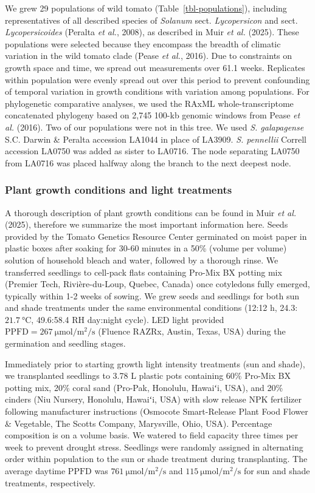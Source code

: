 \documentclass[
  letterpaper,
  DIV=11,
  numbers=noendperiod]{scrartcl}
\newcommand{\ppfd}{$\mathrm{PPFD}$}
\newcommand{\ppfdqty}[1]{$\SI{#1}{\micro\mole\per\meter\squared\per\second}$}
\begin{document}
We grew 29 populations of wild tomato (Table~\ref{tbl-populations}),
including representatives of all described species of \emph{Solanum}
sect. \emph{Lycopersicon} and sect. \emph{Lycopersicoides} (Peralta
\emph{et al.}, 2008), as described in Muir \emph{et al.} (2025). These
populations were selected because they encompass the breadth of climatic
variation in the wild tomato clade (Pease \emph{et al.}, 2016). Due to
constraints on growth space and time, we spread out measurements over
61.1 weeks. Replicates within population were evenly spread out over
this period to prevent confounding of temporal variation in growth
conditions with variation among populations. For phylogenetic
comparative analyses, we used the RAxML whole-transcriptome concatenated
phylogeny based on 2,745 100-kb genomic windows from Pease \emph{et al.}
(2016). Two of our populations were not in this tree. We used \emph{S.
galapagense} S.C. Darwin \& Peralta accession LA1044 in place of LA3909.
\emph{S. pennellii} Correll accession LA0750 was added as sister to
LA0716. The node separating LA0750 from LA0716 was placed halfway along
the branch to the next deepest node.

\subsubsection{Plant growth conditions and light
treatments}\label{plant-growth-conditions-and-light-treatments}

A thorough description of plant growth conditions can be found in Muir
\emph{et al.} (2025), therefore we summarize the most important
information here. Seeds provided by the Tomato Genetics Resource Center
germinated on moist paper in plastic boxes after soaking for 30-60
minutes in a 50\% (volume per volume) solution of household bleach and
water, followed by a thorough rinse. We transferred seedlings to
cell-pack flats containing Pro-Mix BX potting mix (Premier Tech,
Rivière-du-Loup, Quebec, Canada) once cotyledons fully emerged,
typically within 1-2 weeks of sowing. We grew seeds and seedlings for
both sun and shade treatments under the same environmental conditions
(12:12 h, 24.3:\(\SI{21.7}{\degreeCelsius}\), 49.6:58.4 RH day:night
cycle). LED light provided
\(\mathrm{PPFD} = \SI{267}{\micro\mole\per\meter\squared\per\second}\)
(Fluence RAZRx, Austin, Texas, USA) during the germination and seedling
stages.

Immediately prior to starting growth light intensity treatments (sun and
shade), we transplanted seedlings to 3.78 L plastic pots containing 60\%
Pro-Mix BX potting mix, 20\% coral sand (Pro-Pak, Honolulu, Hawaiʻi,
USA), and 20\% cinders (Niu Nursery, Honolulu, Hawaiʻi, USA) with slow
release NPK fertilizer following manufacturer instructions (Osmocote
Smart-Release Plant Food Flower \& Vegetable, The Scotts Company,
Marysville, Ohio, USA). Percentage composition is on a volume basis. We
watered to field capacity three times per week to prevent drought
stress. Seedlings were randomly assigned in alternating order within
population to the sun or shade treatment during transplanting. The
average daytime \ppfd{} was \ppfdqty{761} and \ppfdqty{115} for sun and
shade treatments, respectively.
\end{document}
